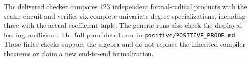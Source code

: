 The delivered checker compares 123 independent formal-radical products
with the scalar circuit and verifies six complete univariate degree
specializations, including three with the actual coefficient tuple.
The generic runs also check the displayed leading coefficient. The full
proof details are in \texttt{positive/POSITIVE\_PROOF.md}. These finite
checks support the algebra and do not replace the inherited compiler
theorems or claim a new end-to-end formalization.
